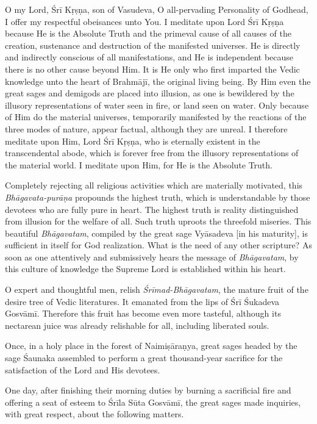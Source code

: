 \documentclass[twoside]{purana}
\begin{document}
O my Lord, Śrī Kṛṣṇa, son of Vasudeva, O all-pervading Personality of Godhead,
I offer my respectful obeisances unto You. I meditate upon Lord Śrī Kṛṣṇa
because He is the Absolute Truth and the primeval cause of all causes of
the creation, sustenance and destruction of the manifested universes. He is
directly and indirectly conscious of all manifestations, and He is independent
because there is no other cause beyond Him. It is He only who first imparted
the Vedic knowledge unto the heart of Brahmājī, the original living being.
By Him even the great sages and demigods are placed into illusion, as one is
bewildered by the illusory representations of water seen in fire, or land seen
on water. Only because of Him do the material universes, temporarily manifested
by the reactions of the three modes of nature, appear factual, although they are
unreal. I therefore meditate upon Him, Lord Śrī Kṛṣṇa, who is eternally existent
in the transcendental abode, which is forever free from the illusory
representations of the material world. I meditate upon Him, for He is
the Absolute Truth.

Completely rejecting all religious activities which are materially motivated,
this \emph{Bhāgavata-purāṇa} propounds the highest truth, which is
understandable by those devotees who are fully pure in heart. The highest truth
is reality distinguished from illusion for the welfare of all. Such truth
uproots the threefold miseries. This beautiful \emph{Bhāgavatam}, compiled by
the great sage Vyāsadeva [in his maturity], is sufficient in itself for God
realization. What is the need of any other scripture? As soon as one attentively
and submissively hears the message of \emph{Bhāgavatam}, by this culture of
knowledge the Supreme Lord is established within his heart.

O expert and thoughtful men, relish \emph{Śrīmad-Bhāgavatam}, the mature fruit
of the desire tree of Vedic literatures. It emanated from the lips of Śrī
Śukadeva Gosvāmī. Therefore this fruit has become even more tasteful, although
its nectarean juice was already relishable for all, including liberated souls.

Once, in a holy place in the forest of Naimiṣāraṇya, great sages headed by
the sage Śaunaka assembled to perform a great thousand-year sacrifice for
the satisfaction of the Lord and His devotees.

One day, after finishing their morning duties by burning a sacrificial fire and
offering a seat of esteem to Śrīla Sūta Gosvāmī, the great sages made inquiries,
with great respect, about the following matters.
\end{document}
